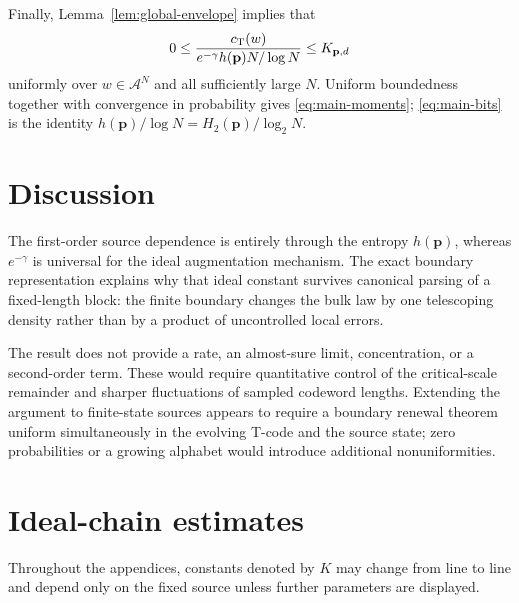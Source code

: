 \documentclass[journal]{IEEEtran}
\theoremstyle{plain}
\theoremstyle{definition}
\theoremstyle{remark}
\newcommand{\A}{\mathcal A}
\newcommand{\hp}{h(\mathbf p)}
\newcommand{\cT}{c_{\rm T}}
\begin{document}
Finally, Lemma~\ref{lem:global-envelope} implies that
\begin{equation*}
 0\le \frac{\cT(w)}{e^{-\gamma}\hp N/\log N}\le K_{\mathbf p,d}
\end{equation*}
uniformly over $w\in\A^N$ and all sufficiently large $N$.  Uniform boundedness together with convergence in probability gives \eqref{eq:main-moments}; \eqref{eq:main-bits} is the identity $\hp/\log N=H_2(\mathbf p)/\log_2N$.

\section{Discussion}\label{sec:discussion}

The first-order source dependence is entirely through the entropy $\hp$, whereas $e^{-\gamma}$ is universal for the ideal augmentation mechanism.  The exact boundary representation explains why that ideal constant survives canonical parsing of a fixed-length block: the finite boundary changes the bulk law by one telescoping density rather than by a product of uncontrolled local errors.

The result does not provide a rate, an almost-sure limit, concentration, or a second-order term.  These would require quantitative control of the critical-scale remainder and sharper fluctuations of sampled codeword lengths.  Extending the argument to finite-state sources appears to require a boundary renewal theorem uniform simultaneously in the evolving T-code and the source state; zero probabilities or a growing alphabet would introduce additional nonuniformities.

\appendices

\section{Ideal-chain estimates}\label{app:ideal-estimates}

Throughout the appendices, constants denoted by $K$ may change from line to line and depend only on the fixed source unless further parameters are displayed.
\end{document}
